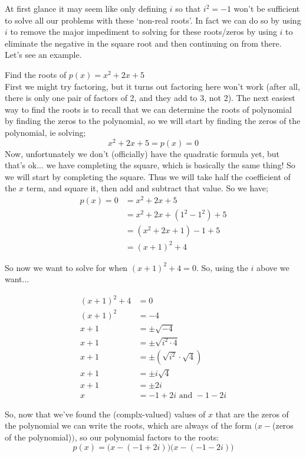 \documentclass{ximeraXloud}
\begin{document}
    At first glance it may seem like only defining $i$ so that $i^2 = -1$ won't be sufficient to solve all our problems with these `non-real roots'. In fact we can do so by using $i$ to remove the major impediment to solving for these roots/zeros by using $i$ to eliminate the negative in the square root and then continuing on from there. Let's see an example.
    
    \begin{example}
        Find the roots of $p(x) = x^2 + 2x + 5$\\
        
        First we might try factoring, but it turns out factoring here won't work (after all, there is only one pair of factors of 2, and they add to 3, not 2). The next easiest way to find the roots is to recall that we can determine the roots of polynomial by finding the zeros to the polynomial, so we will start by finding the zeros of the polynomial, ie solving;
        \[
            x^2 + 2x + 5 = p(x) = 0
        \]
        Now, unfortunately we don't (officially) have the quadratic formula yet, but that's ok... we have completing the square, which is basically the same thing! So we will start by completing the square. Thus we will take half the coefficient of the $x$ term, and square it, then add and subtract that value. So we have;
        \begin{align*}
            p(x) = 0    &= x^2 + 2x + 5                 \\
                        &= x^2 + 2x + (1^2 - 1^2) + 5   \\
                        &= (x^2 + 2x + 1) - 1 + 5       \\
                        &= (x+1)^2 + 4
        \end{align*}
        
        So now we want to solve for when $(x+1)^2 + 4 = 0$. So, using the $i$ above we want...
        
        \begin{align*}
            (x+1)^2 + 4 &= 0                                \\
            (x+1)^2     &= -4                               \\
            x+1         &= \pm \sqrt{-4}                    \\
            x + 1       &= \pm \sqrt{i^2 \cdot 4}           \\
            x + 1       &= \pm (\sqrt{i^2}\cdot \sqrt{4})   \\
            x + 1       &= \pm i\sqrt{4}                    \\
            x+1         &= \pm 2i                           \\
            x           &= -1 + 2i \text{ and } -1 - 2i 
        \end{align*}
        
        So, now that we've found the (complx-valued) values of $x$ that are the zeros of the polynomial we can write the roots, which are always of the form $(x - $(zeros of the polynomial)$)$, so our polynomial factors to the roots:
        \[
            p(x) = \bigg(x- (-1 + 2i)\bigg)\bigg(x - (-1 - 2i)\bigg)
        \]
    \end{example}%
\end{document}
